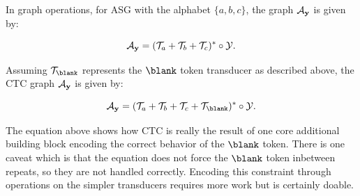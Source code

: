 In graph operations, for ASG with the alphabet $\{a, b, c\}$, the graph
$\mathcal{A}_{\bf y}$ is given by:

$$
\mathcal{A}_{\bf y} = (\mathcal{T}_a + \mathcal{T}_b + \mathcal{T}_c)^* \circ \mathcal{Y}.
$$

Assuming $\gT_\blank$ represents the $\blank$ token transducer as described
above, the CTC graph $\mathcal{A}_{\bf y}$ is given by:

$$
\gA_\vy = (\gT_a + \gT_b + \gT_c + \gT_\blank)^* \circ \gY.
$$

The equation above shows how CTC is really the result of one core additional
building block encoding the correct behavior of the $\blank$ token. There is
one caveat which is that the equation does not force the $\blank$ token
inbetween repeats, so they are not handled correctly. Encoding this constraint
through operations on the simpler transducers requires more work but is
certainly doable.
